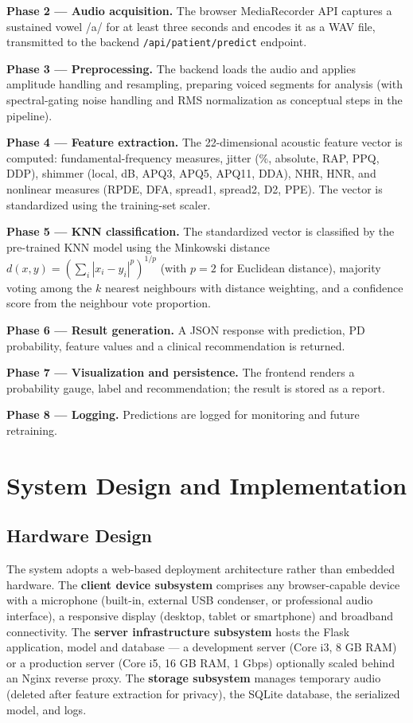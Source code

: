 \documentclass[oneside,a4paper,12pt]{report}
\begin{document}
\textbf{Phase 2 --- Audio acquisition.} The browser MediaRecorder API captures a
sustained vowel /a/ for at least three seconds and encodes it as a WAV file,
transmitted to the backend \texttt{/api/patient/predict} endpoint.

\textbf{Phase 3 --- Preprocessing.} The backend loads the audio and applies
amplitude handling and resampling, preparing voiced segments for analysis (with
spectral-gating noise handling and RMS normalization as conceptual steps in the
pipeline).

\textbf{Phase 4 --- Feature extraction.} The 22-dimensional acoustic feature
vector is computed: fundamental-frequency measures, jitter (\%, absolute, RAP,
PPQ, DDP), shimmer (local, dB, APQ3, APQ5, APQ11, DDA), NHR, HNR, and nonlinear
measures (RPDE, DFA, spread1, spread2, D2, PPE). The vector is standardized using
the training-set scaler.

\textbf{Phase 5 --- KNN classification.} The standardized vector is classified by
the pre-trained KNN model using the Minkowski distance
$d(x,y) = \left(\sum_i |x_i - y_i|^p\right)^{1/p}$ (with $p=2$ for Euclidean
distance), majority voting among the $k$ nearest neighbours with distance
weighting, and a confidence score from the neighbour vote proportion.

\textbf{Phase 6 --- Result generation.} A JSON response with prediction, PD
probability, feature values and a clinical recommendation is returned.

\textbf{Phase 7 --- Visualization and persistence.} The frontend renders a
probability gauge, label and recommendation; the result is stored as a report.

\textbf{Phase 8 --- Logging.} Predictions are logged for monitoring and future
retraining.

\chapter{System Design and Implementation}

\section{Hardware Design}
The system adopts a web-based deployment architecture rather than embedded
hardware. The \textbf{client device subsystem} comprises any browser-capable
device with a microphone (built-in, external USB condenser, or professional audio
interface), a responsive display (desktop, tablet or smartphone) and broadband
connectivity. The \textbf{server infrastructure subsystem} hosts the Flask
application, model and database --- a development server (Core i3, 8 GB RAM) or a
production server (Core i5, 16 GB RAM, 1 Gbps) optionally scaled behind an Nginx
reverse proxy. The \textbf{storage subsystem} manages temporary audio (deleted
after feature extraction for privacy), the SQLite database, the serialized model,
and logs.
\end{document}
